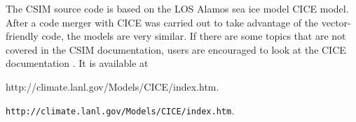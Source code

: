 The CSIM source code is based on the LOS Alamos sea ice model CICE model.
After a code merger with CICE was carried out to take advantage of the vector-
friendly code, the models are very similar.  If there are some topics that
are not covered in the CSIM documentation, users are encouraged to look
at the CICE documentation \cite{cice04}.  It is available at \\
\begin{htmlonly}
                    {http://climate.lanl.gov/Models/CICE/index.htm}.
\end{htmlonly}
\begin{latexonly}
                    {\tt http://climate.lanl.gov/Models/CICE/index.htm}.
\end{latexonly}

